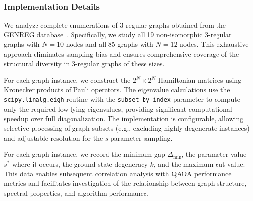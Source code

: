 \subsubsection{Implementation Details}

We analyze complete enumerations of 3-regular graphs obtained from the GENREG database~\cite{meringer1999}. Specifically, we study all 19 non-isomorphic 3-regular graphs with $N=10$ nodes and all 85 graphs with $N=12$ nodes. This exhaustive approach eliminates sampling bias and ensures comprehensive coverage of the structural diversity in 3-regular graphs of these sizes.

For each graph instance, we construct the $2^N \times 2^N$ Hamiltonian matrices using Kronecker products of Pauli operators. The eigenvalue calculations use the \texttt{scipy.linalg.eigh} routine with the \texttt{subset\_by\_index} parameter to compute only the required low-lying eigenvalues, providing significant computational speedup over full diagonalization. The implementation is configurable, allowing selective processing of graph subsets (e.g., excluding highly degenerate instances) and adjustable resolution for the $s$ parameter sampling.

For each graph instance, we record the minimum gap $\Delta_{\text{min}}$, the parameter value $s^*$ where it occurs, the ground state degeneracy $k$, and the maximum cut value. This data enables subsequent correlation analysis with QAOA performance metrics and facilitates investigation of the relationship between graph structure, spectral properties, and algorithm performance.
